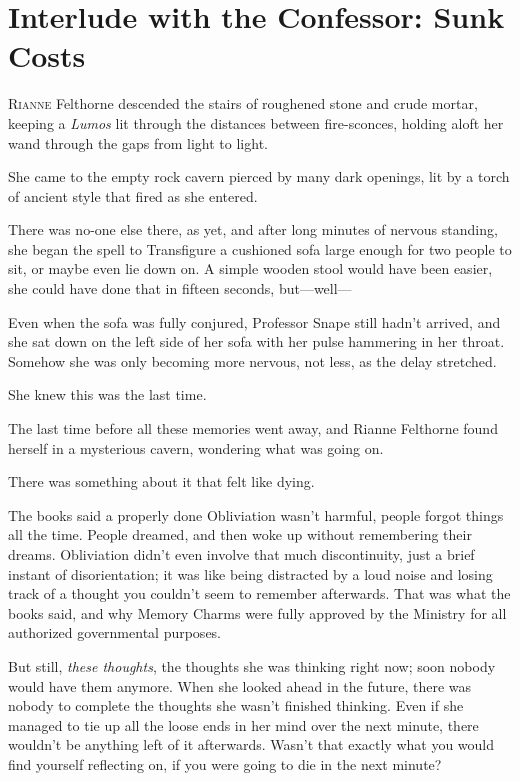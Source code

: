 \chapter{Interlude with the Confessor: Sunk Costs}

\lettrine{R}{ianne} Felthorne descended the stairs of roughened stone and crude mortar, keeping a \emph{Lumos} lit through the distances between fire-sconces, holding aloft her wand through the gaps from light to light.

She came to the empty rock cavern pierced by many dark openings, lit by a torch of ancient style that fired as she entered.

There was no-one else there, as yet, and after long minutes of nervous standing, she began the spell to Transfigure a cushioned sofa large enough for two people to sit, or maybe even lie down on. A simple wooden stool would have been easier, she could have done that in fifteen seconds, but—well—

Even when the sofa was fully conjured, Professor Snape still hadn't arrived, and she sat down on the left side of her sofa with her pulse hammering in her throat. Somehow she was only becoming more nervous, not less, as the delay stretched.

She knew this was the last time.

The last time before all these memories went away, and Rianne Felthorne found herself in a mysterious cavern, wondering what was going on.

There was something about it that felt like dying.

The books said a properly done Obliviation wasn't harmful, people forgot things all the time. People dreamed, and then woke up without remembering their dreams. Obliviation didn't even involve that much discontinuity, just a brief instant of disorientation; it was like being distracted by a loud noise and losing track of a thought you couldn't seem to remember afterwards. That was what the books said, and why Memory Charms were fully approved by the Ministry for all authorized governmental purposes.

But still, \emph{these thoughts}, the thoughts she was thinking right now; soon nobody would have them anymore. When she looked ahead in the future, there was nobody to complete the thoughts she wasn't finished thinking. Even if she managed to tie up all the loose ends in her mind over the next minute, there wouldn't be anything left of it afterwards. Wasn't that exactly what you would find yourself reflecting on, if you were going to die in the next minute?

